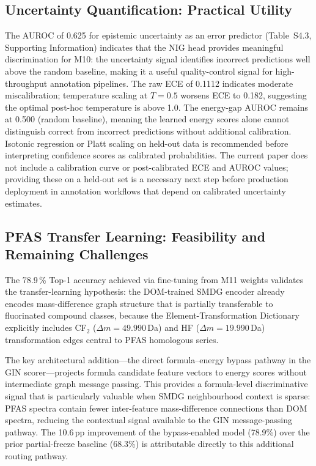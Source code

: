 \documentclass[journal=jcisd8]{achemso}
\begin{document}
\subsection{Uncertainty Quantification: Practical Utility}

The AUROC of 0.625 for epistemic uncertainty as an error predictor (Table~S4.3, Supporting Information)
indicates that the NIG head provides meaningful discrimination for M10: the uncertainty
signal identifies incorrect predictions well above the random baseline, making it a
useful quality-control signal for high-throughput annotation pipelines.
The raw ECE of 0.1112 indicates moderate miscalibration; temperature scaling at
$T=0.5$ worsens ECE to 0.182, suggesting the optimal post-hoc temperature is
above 1.0.  The energy-gap AUROC remains at 0.500 (random baseline), meaning the
learned energy scores alone cannot distinguish correct from incorrect predictions
without additional calibration.  Isotonic regression or Platt scaling on held-out data
is recommended before interpreting confidence scores as calibrated probabilities.
The current paper does not include a calibration curve or post-calibrated ECE and AUROC
values; providing these on a held-out set is a necessary next step before production
deployment in annotation workflows that depend on calibrated uncertainty estimates.

\subsection{PFAS Transfer Learning: Feasibility and Remaining Challenges}

The 78.9\,\% Top-1 accuracy achieved via fine-tuning from M11 weights validates the
transfer-learning hypothesis: the DOM-trained SMDG encoder already encodes
mass-difference graph structure that is partially transferable to fluorinated compound
classes, because the Element-Transformation Dictionary explicitly includes CF$_2$
($\Delta m = 49.990$\,Da) and HF ($\Delta m = 19.990$\,Da) transformation edges
central to PFAS homologous series.

The key architectural addition---the direct formula--energy bypass pathway in the GIN
scorer---projects formula candidate feature vectors to energy scores without
intermediate graph message passing.  This provides a formula-level discriminative
signal that is particularly valuable when SMDG neighbourhood context is sparse:
PFAS spectra contain fewer inter-feature mass-difference connections than DOM spectra,
reducing the contextual signal available to the GIN message-passing pathway.  The
10.6\,pp improvement of the bypass-enabled model (78.9\%) over the prior
partial-freeze baseline (68.3\%) is attributable directly to this additional
routing pathway.
\end{document}
